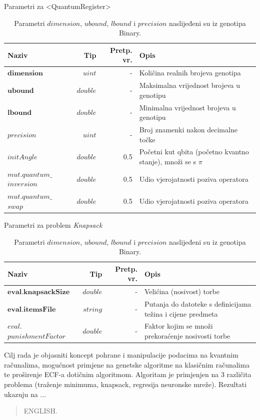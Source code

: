 \documentclass[times, utf8, zavrsni]{fer}
\begin{document}
\begin{table}[htb]
\caption{Parametri za <QuantumRegister>}
\label{tbl:param_kvareg}
\centering
\caption*{\footnotesize Parametri $dimension$, $ubound$, $lbound$ i $precision$ naslijeđeni su iz genotipa Binary.}
\begin{tabular}{|p{3cm}|r|r|p{7cm}|} \hline
Naziv & Tip & Pretp. vr. & Opis\\ \hline
$\textbf{dimension}$ & $uint$ & - & Količina realnih brojeva genotipa \\
$\textbf{ubound}$ & $double$ & - & Maksimalna vrijednost brojeva u genotipu \\
$\textbf{lbound}$ & $double$ & - & Minimalna vrijednost brojeva u genotipu \\
$precision$ & $uint$ & - & Broj znamenki nakon decimalne točke \\
$initAngle$ & $double$ & 0.5 & Početni kut qbita (početno kvantno stanje), množi se s $\pi$ \\
$mut.quantum\_$ $inversion$ & $double$ & 0.5 & Udio vjerojatnosti poziva operatora \\
$mut.quantum\_$ $swap$ & $double$ & 0.5 & Udio vjerojatnosti poziva operatora \\ \hline
\end{tabular}
\end{table}

\begin{table}[htb]
\caption{Parametri za problem \it Knapsack\rm}
\label{tbl:param_kvareg}
\centering
\caption*{\footnotesize Parametri $dimension$, $ubound$, $lbound$ i $precision$ naslijeđeni su iz genotipa Binary.}
\begin{tabular}{|p{4cm}|r|r|p{6cm}|} \hline
Naziv & Tip & Pretp. vr. & Opis\\ \hline
$\textbf{eval.knapsackSize}$ & $double$ & - & Velićina (nosivost) torbe \\
$\textbf{eval.itemsFile}$ & $string$ & - & Putanja do datoteke s definicijama težina i cijene predmeta \\
$eval.$ $punishmentFactor$ & $double$ & - & Faktor kojim se množi prekoraćenje nosivosti torbe \\ \hline
\end{tabular}
\end{table}

\begin{sazetak}
Cilj rada je objasniti koncept pohrane i manipulacije podacima na kvantnim računalima, mogućnost primjene na genetske algoritme na klasičnim računalima te proširenje ECF-a dotičnim algoritmom. Algoritam je primjenjen na 3 različita problema (traženje minimuma, knapsack, regresija neuronske mreže). Rezultati ukazuju na ...

\end{sazetak}

\begin{abstract}
ENGLISH.

\end{abstract}
\end{document}
